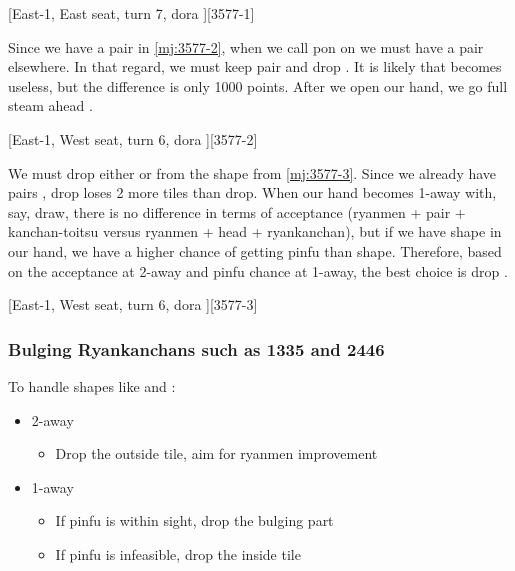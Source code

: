 \documentclass[12pt]{article}
\begin{document}
[East-1, East seat, turn 7, dora ][3577-1]

Since we have a  pair in \ref{mj:3577-2}, when we call pon on  we must have a pair elsewhere. In that regard, we must keep  pair and drop . It is likely that  becomes useless, but the difference is only 1000 points. After we open our hand, we go full steam ahead \citep[][p.~26]{uzaku-nankiru}.

[East-1, West seat, turn 6, dora ][3577-2]

We must drop either  or  from the shape  from \ref{mj:3577-3}. Since we already have pairs ,  drop loses 2 more tiles than  drop. When our hand becomes 1-away with, say,  draw, there is no difference in terms of acceptance (ryanmen + pair + kanchan-toitsu versus ryanmen + head + ryankanchan), but if we have  shape in our hand, we have a higher chance of getting pinfu than  shape. Therefore, based on the acceptance at 2-away and pinfu chance at 1-away, the best choice is  drop \citep{zundamon-3head}.

[East-1, West seat, turn 6, dora ][3577-3]


\subsubsection*{Bulging Ryankanchans such as 1335 and 2446}

To handle shapes like  and :

\begin{itemize}
  \item 2-away
  \begin{itemize}
    \item Drop the outside tile, aim for ryanmen improvement
  \end{itemize}
  \item 1-away
  \begin{itemize}
    \item If pinfu is within sight, drop the bulging part
    \item If pinfu is infeasible, drop the inside tile
  \end{itemize}
\end{itemize}
\end{document}
